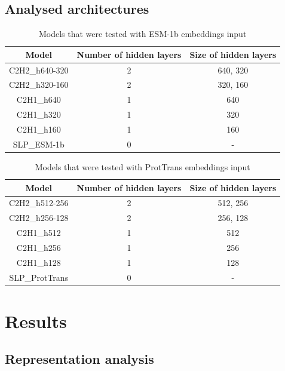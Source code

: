 \documentclass[12pt]{article}
\begin{document}
	\newpage

	\subsection{Analysed architectures}

	\begin{table}[h!]
		\caption{Models that were tested with ESM-1b embeddings input}
		\vspace{0.2cm}
		\centering
		\begin{tabular}{ | c | c c | }
			\hline 
			Model & Number of hidden layers & Size of hidden layers \\
			\hline 
			C2H2\_h640-320 & 2 & 640, 320 \\
			C2H2\_h320-160 & 2 & 320, 160 \\
			C2H1\_h640 & 1 & 640 \\
			C2H1\_h320 & 1 & 320 \\
			C2H1\_h160 & 1 & 160 \\
			SLP\_ESM-1b & 0 & - \\
			\hline    
		\end{tabular}
		\label{table:modelArchitecturesESM}
	\end{table}

	\begin{table}[h!]
		\caption{Models that were tested with ProtTrans embeddings input}
		\vspace{0.2cm}
		\centering
		\begin{tabular}{ | c | c c | }
			\hline 
			Model & Number of hidden layers & Size of hidden layers \\
			\hline 
			C2H2\_h512-256 & 2 & 512, 256 \\
			C2H2\_h256-128 & 2 & 256, 128 \\
			C2H1\_h512 & 1 & 512 \\
			C2H1\_h256 & 1 & 256 \\
			C2H1\_h128 & 1 & 128 \\
			SLP\_ProtTrans & 0 & - \\
			\hline    
		\end{tabular}
		\label{table:modelArchitecturesPT}
	\end{table}

	\newpage

	\section{Results}

	\subsection{Representation analysis}
\end{document}
